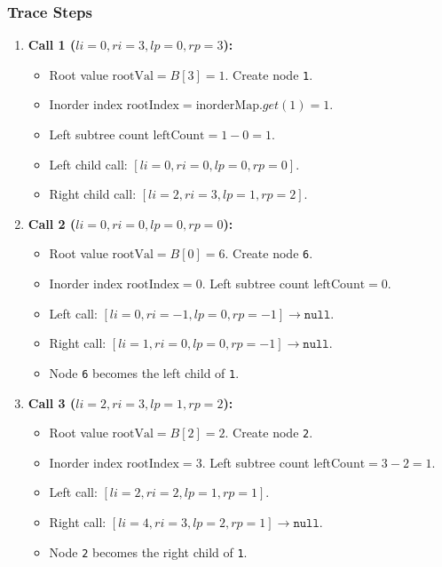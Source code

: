 \documentclass[10pt,journal,compsoc,onecolumn]{IEEEtran}
\begin{document}
\subsubsection{Trace Steps}
\begin{enumerate}
    \item \textbf{Call 1 ($li=0, ri=3, lp=0, rp=3$):}
    \begin{itemize}
        \item Root value $\text{rootVal} = B[3] = 1$. Create node \texttt{1}.
        \item Inorder index $\text{rootIndex} = \text{inorderMap}.get(1) = 1$.
        \item Left subtree count $\text{leftCount} = 1 - 0 = 1$.
        \item Left child call: $[li=0, ri=0, lp=0, rp=0]$.
        \item Right child call: $[li=2, ri=3, lp=1, rp=2]$.
    \end{itemize}
    
    \item \textbf{Call 2 ($li=0, ri=0, lp=0, rp=0$):}
    \begin{itemize}
        \item Root value $\text{rootVal} = B[0] = 6$. Create node \texttt{6}.
        \item Inorder index $\text{rootIndex} = 0$. Left subtree count $\text{leftCount} = 0$.
        \item Left call: $[li=0, ri=-1, lp=0, rp=-1] \to \texttt{null}$.
        \item Right call: $[li=1, ri=0, lp=0, rp=-1] \to \texttt{null}$.
        \item Node \texttt{6} becomes the left child of \texttt{1}.
    \end{itemize}
    
    \item \textbf{Call 3 ($li=2, ri=3, lp=1, rp=2$):}
    \begin{itemize}
        \item Root value $\text{rootVal} = B[2] = 2$. Create node \texttt{2}.
        \item Inorder index $\text{rootIndex} = 3$. Left subtree count $\text{leftCount} = 3 - 2 = 1$.
        \item Left call: $[li=2, ri=2, lp=1, rp=1]$.
        \item Right call: $[li=4, ri=3, lp=2, rp=1] \to \texttt{null}$.
        \item Node \texttt{2} becomes the right child of \texttt{1}.
    \end{itemize}


\end{enumerate}
\end{document}
